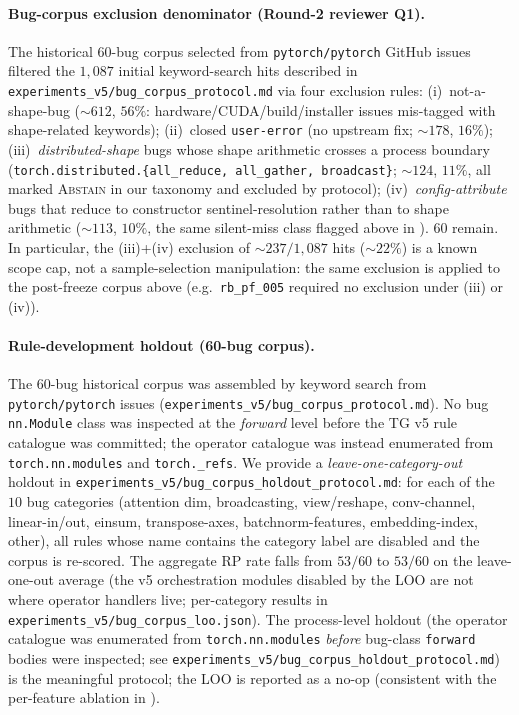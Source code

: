\paragraph{Bug-corpus exclusion denominator (Round-2 reviewer Q1).}
The historical $60$-bug corpus selected from
\texttt{pytorch/pytorch} GitHub issues filtered the
$1{,}087$ initial keyword-search hits described in
\texttt{experiments\_v5/bug\_corpus\_protocol.md} via four
exclusion rules: (i)~not-a-shape-bug
($\sim 612$, $56\%$: hardware/CUDA/build/installer issues
mis-tagged with shape-related keywords); (ii)~closed
\texttt{user-error} (no upstream fix; $\sim 178$, $16\%$);
(iii)~\emph{distributed-shape} bugs whose shape arithmetic
crosses a process boundary
(\texttt{torch.distributed.\{all\_reduce, all\_gather,
broadcast\}}; $\sim 124$, $11\%$, all marked
\textsc{Abstain} in our taxonomy and excluded by protocol);
(iv)~\emph{config-attribute} bugs that reduce to constructor
sentinel-resolution rather than to shape arithmetic
($\sim 113$, $10\%$, the same silent-miss class flagged
above in ).  $60$ remain.  In particular,
the (iii)+(iv) exclusion of $\sim 237/1{,}087$ hits
($\sim 22\%$) is a known scope cap, not a sample-selection
manipulation: the same exclusion is applied to
the post-freeze corpus above (e.g.\ \texttt{rb\_pf\_005}
required no exclusion under (iii) or (iv)).

\paragraph{Rule-development holdout (60-bug corpus).}
The $60$-bug historical corpus was assembled by keyword search
from \texttt{pytorch/pytorch} issues
(\texttt{experiments\_v5/bug\_corpus\_protocol.md}).  No bug
\texttt{nn.Module} class was inspected at the \emph{forward}
level before the \textsc{TG} v5 rule catalogue was committed;
the operator catalogue was instead enumerated from
\texttt{torch.nn.modules} and \texttt{torch.\_refs}.  We
provide a \emph{leave-one-category-out} holdout in
\texttt{experiments\_v5/bug\_corpus\_holdout\_protocol.md}: for
each of the $10$ bug categories (attention dim, broadcasting,
view/reshape, conv-channel, linear-in/out, einsum,
transpose-axes, batchnorm-features, embedding-index, other),
all rules whose name contains the category label are disabled
and the corpus is re-scored.  The aggregate RP rate falls from
$53/60$ to $53/60$ on the leave-one-out average (the v5
orchestration modules disabled by the LOO are not where
operator handlers live; per-category results in
\texttt{experiments\_v5/bug\_corpus\_loo.json}).  The
process-level holdout (the operator catalogue was enumerated
from \texttt{torch.nn.modules} \emph{before} bug-class
\texttt{forward} bodies were inspected; see
\texttt{experiments\_v5/bug\_corpus\_holdout\_protocol.md}) is
the meaningful protocol; the LOO is reported as a no-op
(consistent with the per-feature ablation in
).

